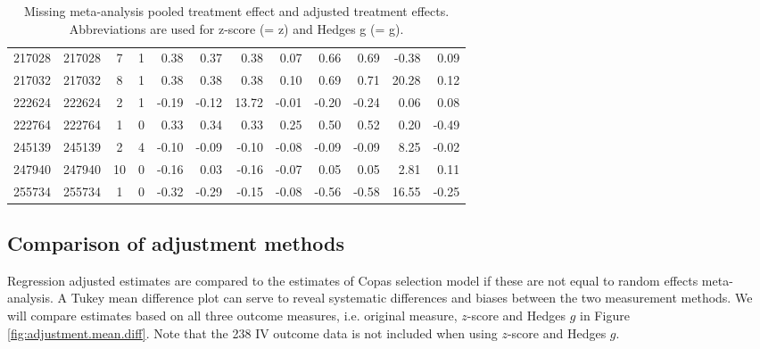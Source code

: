 \documentclass[11pt,a4paper,twoside]{book}\usepackage[]{graphicx}\usepackage[]{color}
\begin{document}
\begin{table}[ht]
\begin{tabular}{lcccrrrrrrrr}
  217028 & 217028 & 7 & 1 & 0.38 & 0.37 & 0.38 & 0.07 & 0.66 & 0.69 & -0.38 & 0.09 \\ 
  217032 & 217032 & 8 & 1 & 0.38 & 0.38 & 0.38 & 0.10 & 0.69 & 0.71 & 20.28 & 0.12 \\ 
  222624 & 222624 & 2 & 1 & -0.19 & -0.12 & 13.72 & -0.01 & -0.20 & -0.24 & 0.06 & 0.08 \\ 
  222764 & 222764 & 1 & 0 & 0.33 & 0.34 & 0.33 & 0.25 & 0.50 & 0.52 & 0.20 & -0.49 \\ 
  245139 & 245139 & 2 & 4 & -0.10 & -0.09 & -0.10 & -0.08 & -0.09 & -0.09 & 8.25 & -0.02 \\ 
  247940 & 247940 & 10 & 0 & -0.16 & 0.03 & -0.16 & -0.07 & 0.05 & 0.05 & 2.81 & 0.11 \\ 
  255734 & 255734 & 1 & 0 & -0.32 & -0.29 & -0.15 & -0.08 & -0.56 & -0.58 & 16.55 & -0.25 \\ 
   \hline
\end{tabular}
\endgroup
\caption{Missing meta-analysis pooled treatment effect and adjusted treatment effects. Abbreviations are used for z-score (= z) and Hedges g (= g).} 
\label{missing.differences}
\end{table}




\subsection{Comparison of adjustment methods}
Regression adjusted estimates are compared to the estimates of Copas selection model if these are not equal to random effects meta-analysis. A Tukey mean difference plot can serve to reveal systematic differences and biases between the two measurement methods. We will compare estimates based on all three outcome measures, i.e. original measure, $z$-score and Hedges $g$ in Figure \ref{fig:adjustment.mean.diff}. Note that the 238 IV outcome data is not included when using $z$-score and Hedges $g$.
\end{document}

